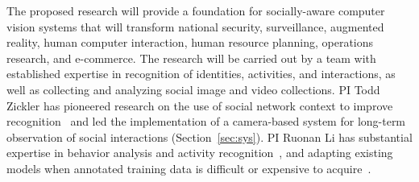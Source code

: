 
The proposed research will provide a foundation for socially-aware computer vision systems that will transform national security, surveillance, augmented reality, human computer interaction, human resource planning, operations research, and e-commerce. The research will be carried out by a team with established expertise in recognition of identities, activities, and interactions, as well as collecting and analyzing social image and video collections. PI Todd Zickler has pioneered research on the use of social network context to improve recognition~\cite{Stone2008,Stone2010} and led the implementation of a camera-based system for long-term observation of social interactions (Section~\ref{sec:sys}). PI Ruonan Li has substantial expertise in behavior analysis and activity recognition~\cite{groupdet2013,LiIJCV2012,LiPAMI2012,Li2010}, and adapting existing models when annotated training data is difficult or expensive to acquire~\cite{LiZickler2012,Li2011}. 




